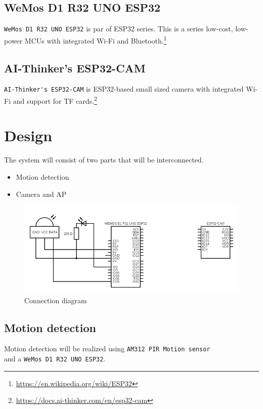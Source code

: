 \documentclass{article}
\begin{document}
    \subsection{WeMos D1 R32 UNO ESP32}
    \verb|WeMos D1 R32 UNO ESP32| is par of ESP32 series.
    This is a series low-cost, low-power MCUs with integrated Wi-Fi
    and Bluetooth.\footnote{\url{https://en.wikipedia.org/wiki/ESP32}}
    
    \subsection{AI-Thinker's ESP32-CAM}
    \verb|AI-Thinker's ESP32-CAM| is ESP32-based small sized camera 
    with integrated Wi-Fi and support for TF cards.\footnote{\url{https://docs.ai-thinker.com/en/esp32-cam}}
    
    \section{Design}
    The system will consist of two parts that will be interconnected.
    \begin{itemize}
        \item Motion detection
        \item Camera and AP
    \end{itemize}
    \begin{figure}[h!]
        \centering
        \includegraphics[scale=0.43,keepaspectratio]{img/circuit.png}
        \caption{Connection diagram}\label{pic:connection_diagram}
    \end{figure} 
    
    \subsection{Motion detection}
    Motion detection will be realized using \verb|AM312 PIR Motion sensor|\\
    and a \verb|WeMos D1 R32 UNO ESP32|.
    
\end{document}
